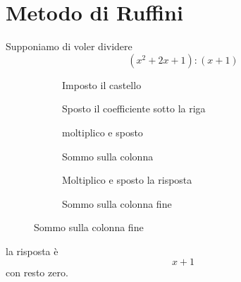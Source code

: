 \section{Metodo di Ruffini}
\begin{esempio}
Supponiamo di voler dividere
\[(x^2+2x+1):(x+1)\]
\begin{figure}
	\begin{subfigure}[b]{0.55\linewidth}
		\centering
		\caption{Imposto il castello}\label{fig:Ruffiniesempio1a}
	\end{subfigure}%
	\captionsetup{skip=0pt}
	\begin{subfigure}[b]{0.55\linewidth}
		\centering\centering
		\caption{Sposto il coefficiente sotto la riga}\label{fig:Ruffiniesempio1b}
	\end{subfigure}
	\begin{subfigure}[b]{.55\linewidth}
		\centering\centering
		\caption{moltiplico e sposto}\label{fig:Ruffiniesempio1c}
	\end{subfigure}%
		\captionsetup{skip=0pt}
	\begin{subfigure}[b]{.55\linewidth}
		\centering\centering
		\caption{Sommo sulla colonna}\label{fig:Ruffiniesempio1d}
	\end{subfigure}
	\begin{subfigure}[b]{.55\linewidth}
			\centering\centering
			\caption{Moltiplico e sposto la risposta}\label{fig:Ruffiniesempio1e}
		\end{subfigure}%
		\captionsetup{skip=0pt}
		\begin{subfigure}[b]{.55\linewidth}
			\centering\centering
			\caption{Sommo sulla colonna fine}\label{fig:Ruffiniesempio1f}
		\end{subfigure}
\label{fig:Ruffiniesempio1}
\end{figure}


la risposta è \[x+1\] con resto zero.
\end{esempio}
